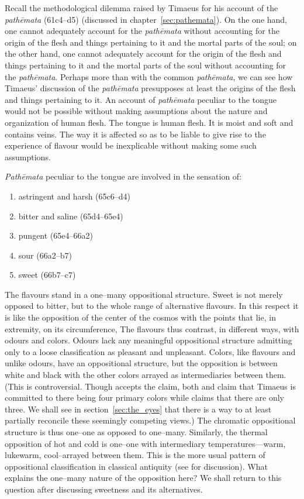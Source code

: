 Recall the methodological dilemma raised by Timaeus for his account of the \emph{pathēmata} (61c4–d5) (discussed in chapter~\ref{sec:pathemata}). On the one hand, one cannot adequately account for the \emph{pathēmata} without accounting for the origin of the flesh and things pertaining to it and the mortal parts of the soul; on the other hand, one cannot adequately account for the origin of the flesh and things pertaining to it and the mortal parts of the soul without accounting for the \emph{pathēmata}. Perhaps more than with the common \emph{pathēmata}, we can see how Timaeus' discussion of the \emph{pathēmata} presupposes at least the origins of the flesh and things pertaining to it. An account of \emph{pathēmata} peculiar to the tongue would not be possible without making assumptions about the nature and organization of human flesh. The tongue is human flesh. It is moist and soft and contains veins. The way it is affected so as to be liable to give rise to the experience of flavour would be inexplicable without making some such assumptions.

\emph{Pathēmata} peculiar to the tongue are involved in the sensation of:
\begin{enumerate}[(1)]
	\item astringent and harsh (65c6--d4)
	\item bitter and saline (65d4--65e4)
	\item pungent (65e4--66a2)
	\item sour (66a2--b7)
	\item sweet (66b7--c7)
\end{enumerate}
The flavours stand in a one--many oppositional structure. Sweet is not merely opposed to bitter, but to the whole range of alternative flavours. In this respect it is like the opposition of the center of the cosmos with the points that lie, in extremity, on its circumference, The flavours thus contrast, in different ways, with odours and colors. Odours lack any meaningful oppositional structure admitting only to a loose classification as pleasant and unpleasant. Colors, like flavours and unlike odours, have an oppositional structure, but the opposition is between white and black with the other colors arrayed as intermediaries between them. (This is controversial. Though \citealt[480--1]{Taylor:1928qb} accepts the claim, both \citealt{Brisson:1997qr} and \citealt{Ierodiakonou:2005ly} claim that Timaeus is committed to there being four primary colors while \citealt[277]{Cornford:1935fk} claims that there are only three. We shall see in section~\ref{sec:the_eyes} that there is a way to at least partially reconcile these seemingly competing views.) The chromatic oppositional structure is thus one--one as opposed to one--many. Similarly, the thermal opposition of hot and cold is one--one with intermediary temperatures---warm, lukewarm, cool--arrayed between them. This is the more usual pattern of oppositional classification in classical antiquity (see \citealt{Lloyd:1966ly} for discussion). What explains the one--many nature of the opposition here? We shall return to this question after discussing sweetness and its alternatives.

